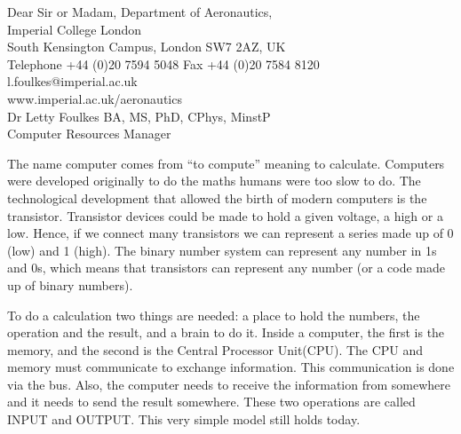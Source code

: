 \documentclass[blank]{impletter}
\begin{document}
{
Dear Sir or Madam,
}
{
Department of Aeronautics,\\
Imperial College London\\

South Kensington Campus, London SW7 2AZ, UK\\
Telephone +44 (0)20 7594 5048 Fax +44 (0)20 7584 8120\\

l.foulkes@imperial.ac.uk\\
www.imperial.ac.uk/aeronautics\\
}
{
Dr Letty Foulkes
}
{
BA, MS, PhD, CPhys, MinstP\\
}
{
Computer Resources Manager\\
}
\informal

The name computer comes from ``to compute'' meaning to
calculate. Computers were developed originally to do the maths humans
were too slow to do. The technological development that allowed the
birth of modern computers is the transistor. Transistor devices could
be made to hold a given voltage, a high or a low. Hence, if we connect
many transistors we can represent a series made up of 0 (low) and 1
(high). The binary number system can represent any number in 1s and
0s, which means that transistors can represent any number (or a code
made up of binary numbers).

To do a calculation two things are needed: a place to hold the
numbers, the operation and the result, and a brain to do it. Inside a
computer, the first is the memory, and the second is the Central
Processor Unit(CPU). The CPU and memory must communicate to exchange
information. This communication is done via the bus. Also, the
computer needs to receive the information from somewhere and it needs
to send the result somewhere. These two operations are called INPUT
and OUTPUT. This very simple model still holds today.
\end{document}
